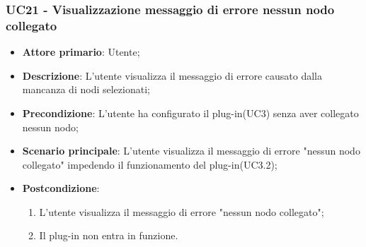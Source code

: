 \subsubsection{UC21 - Visualizzazione messaggio di errore nessun nodo collegato}
\label{sssec:uc21}
\begin{itemize}
  \item \textbf{Attore primario}: Utente;
  \item \textbf{Descrizione}: L'utente visualizza il messaggio di errore causato dalla mancanza di nodi selezionati;
  \item \textbf{Precondizione}: L'utente ha configurato il plug-in(UC3) senza aver collegato nessun nodo;
  \item \textbf{Scenario principale}: L'utente visualizza il messaggio di errore "nessun nodo collegato" impedendo il funzionamento del plug-in(UC3.2);
  \item \textbf{Postcondizione}:
  \begin{enumerate}
		\item L'utente visualizza il messaggio di errore "nessun nodo collegato";
		\item Il plug-in non entra in funzione.
	\end{enumerate}
\end{itemize}
